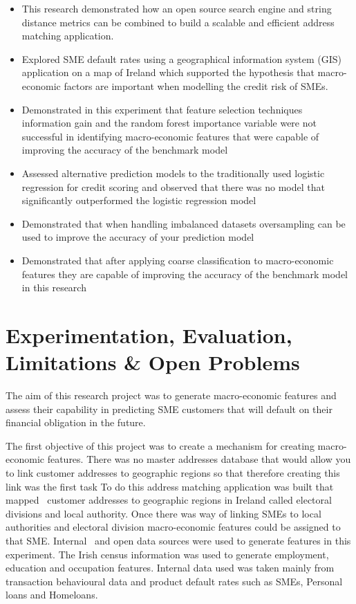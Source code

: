 \begin{itemize}
	\item This research demonstrated how an open source search engine and string distance metrics can be combined to build a scalable and efficient address matching application.
	
	\item Explored SME default rates using a geographical information system (GIS) application on a map of Ireland which supported the hypothesis that macro-economic factors are important when modelling the credit risk of SMEs.
	
	\item Demonstrated in this experiment that feature selection techniques  information gain and the random forest importance variable were not successful in identifying macro-economic features that were capable of improving the accuracy of the benchmark model   
	
	\item Assessed alternative prediction models to the traditionally used logistic regression for credit scoring and observed that there was no model that significantly outperformed the logistic regression model
	
	\item Demonstrated that when handling imbalanced datasets oversampling can be used to improve the accuracy of your prediction model
	
	\item Demonstrated that after applying coarse classification to macro-economic features they are capable of improving the accuracy of the benchmark model in this research
\end{itemize}

\section{Experimentation, Evaluation, Limitations \& Open Problems}
The aim of this research project was to generate macro-economic features and assess their capability in predicting SME customers that will default on their financial obligation in the future. 

The first objective of this project was to create a mechanism for creating macro-economic features. There was no master addresses database that would allow you to link customer addresses to geographic regions so that therefore creating this link was the first task To do this address matching application was built that mapped \subjectname\ customer addresses to geographic regions in Ireland called electoral divisions and local authority. Once there was way of linking SMEs to local authorities and electoral division macro-economic features could be assigned to that SME. Internal \subjectname\ and open data sources were used to generate features in this experiment. The Irish census information was used to generate employment, education and occupation features. Internal data used was taken mainly from transaction behavioural data and product default rates such as SMEs, Personal loans and Homeloans.  

